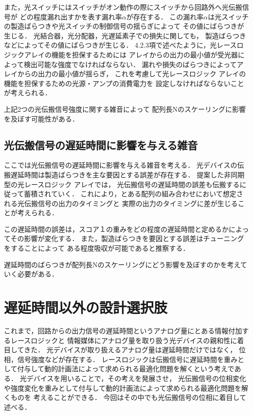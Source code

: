 また，光スイッチにはスイッチがオン動作の際にスイッチから回路外へ光伝搬信号が
どの程度漏れ出すかを表す漏れ率$\alpha$が存在する．
この漏れ率$\alpha$は光スイッチの製造ばらつきや光スイッチの制御信号の揺らぎによって
その値にばらつきが生じる．
光結合器，光分配器，光遅延素子での損失に関しても，
製造ばらつきなどによってその値にばらつきが生じる．
4.2.3項で述べたように，光レースロジックアレイの機能を担保するためには
アレイからの出力の最小値が受光器によって検出可能な強度でなければならない．
漏れや損失のばらつきによってアレイからの出力の最小値が揺らぎ，
これを考慮して光レースロジック アレイの機能を担保するための光源・アンプの消費電力を
設定しなければならないことが考えられる．

上記2つの光伝搬信号強度に関する雑音によって
配列長Nのスケーリングに影響を及ぼす可能性がある．

\subsection{光伝搬信号の遅延時間に影響を与える雑音}
ここでは光伝搬信号の遅延時間に影響を与える雑音を考える．
光デバイスの伝搬遅延時間は製造ばらつきを主な要因とする誤差が存在する．
提案した非同期型の光レースロジック アレイでは，
光伝搬信号の遅延時間の誤差も伝搬するに従って蓄積されていく．
これにより，とある配列の組み合わせにおいて想定される光伝搬信号の出力のタイミングと
実際の出力のタイミングに差が生じることが考えられる．

この遅延時間の誤差は，スコア１の重みをどの程度の遅延時間と定めるかによってその影響が変化する．
また，製造ばらつきを要因とする誤差はチューニングをすることによって
ある程度吸収が可能であると推察する．

遅延時間のばらつきが配列長Nのスケーリングにどう影響を及ぼすのかを考えていく必要がある．

\section{遅延時間以外の設計選択肢}
これまで，回路からの出力信号の遅延時間というアナログ量にとある情報付加するレースロジックと
情報媒体にアナログ量を取り扱う光デバイスの親和性に着目してきた．
光デバイスが取り扱えるアナログ量は遅延時間だけではなく，
位相，信号強度などが存在する．
レースロジックは伝搬信号に遅延時間を重みとして付与して動的計画法によって求められる最適化問題を解くという考えである．
光デバイスを用いることで，その考えを発展させ，
光伝搬信号の位相変化や強度変化を重みとして付与して動的計画法によって求められる最適化問題を解くものを
考えることができる．
今回はその中でも光伝搬信号の位相に着目して述べる．

